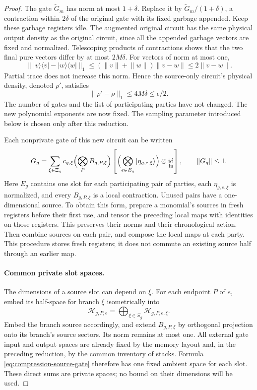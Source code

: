 \documentclass[11pt]{article}
\numberwithin{equation}{section}
\theoremstyle{definition}
\theoremstyle{remark}
\DeclareMathOperator{\id}{id}
\newcommand{\norm}[1]{\lVert #1\rVert}
\begin{document}
\begin{proof}
The gate $\widetilde G_m$ has norm at most $1+\delta$.  Replace it by
$\widetilde G_m/(1+\delta)$, a contraction within $2\delta$ of the
original gate with its fixed garbage appended.  Keep these garbage
registers idle.  The augmented original circuit has the same physical
output density as the original circuit, since all the appended garbage
vectors are fixed and normalized.  Telescoping products of contractions
shows that the two final pure vectors differ by at most $2M\delta$.
For vectors of norm at most one,
\[
 \norm{|v\rangle\langle v|-|w\rangle\langle w|}_1
       \le(\norm{v}+\norm{w})\norm{v-w}
       \le2\norm{v-w}.
\]
Partial trace does not increase this norm.  Hence the source-only
circuit's physical density, denoted $\rho'$, satisfies
\begin{equation}
 \norm{\rho'-\rho}_1\le4M\delta\le\epsilon/2.
 \label{eq:compression-effect-circuit-error}
\end{equation}
The number of gates and the list of participating parties have not
changed.  The new polynomial exponents are now fixed.  The sampling
parameter introduced below is chosen only after this reduction.

Each nonprivate gate of this new circuit can be written
\begin{equation}
 G_g=\sum_{\xi\in\Xi_g}c_{g,\xi}
       \Bigl(\bigotimes_{P}B_{g,P,\xi}\Bigr)
       \left[\Bigl(\bigotimes_{e\in E_g}
                         |\eta_{g,e,\xi}\rangle\Bigr)
                    \otimes\id_{\mathrm{in}}\right],
 \qquad \norm{G_g}\le1.
 \label{eq:compression-source-gate}
\end{equation}
Here $E_g$ contains one slot for each participating pair of parties,
each $\eta_{g,e,\xi}$ is normalized, and every $B_{g,P,\xi}$ is a local
contraction.  Unused pairs have a one-dimensional source.  To obtain
this form, prepare a monomial's sources in fresh registers before their
first use, and tensor the preceding local maps with identities on those
registers.  This preserves their norms and their chronological action.
Then combine sources on each pair, and compose the local maps at each
party.  This procedure stores fresh registers; it does not commute an
existing source half through an earlier map.

\paragraph{Common private slot spaces.}
The dimensions of a source slot can depend on $\xi$.  For each endpoint
$P$ of $e$, embed its half-space for branch $\xi$ isometrically into
\[
 \mathcal H_{g,P,e}
       =\bigoplus_{\xi\in\Xi_g}\mathcal H_{g,P,e,\xi}.
\]
Embed the branch source accordingly, and extend $B_{g,P,\xi}$ by
orthogonal projection onto its branch's source sectors.  Its norm
remains at most one.  All external gate input and output spaces are
already fixed by the memory layout and, in the preceding reduction, by
the common inventory of stacks.  Formula
\eqref{eq:compression-source-gate} therefore has one fixed ambient
space for each slot.  These direct sums are private spaces; no bound on
their dimensions will be used.


\end{proof}
\end{document}
